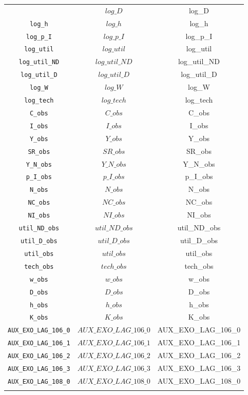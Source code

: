 \begin{center}
\begin{longtable}{ccc}
{\texttt{log\_D} & $log\_D$ & log\_D\\
\texttt{log\_h} & $log\_h$ & log\_h\\
\texttt{log\_p\_I} & $log\_p\_I$ & log\_p\_I\\
\texttt{log\_util} & $log\_util$ & log\_util\\
\texttt{log\_util\_ND} & $log\_util\_ND$ & log\_util\_ND\\
\texttt{log\_util\_D} & $log\_util\_D$ & log\_util\_D\\
\texttt{log\_W} & $log\_W$ & log\_W\\
\texttt{log\_tech} & $log\_tech$ & log\_tech\\
\texttt{C\_obs} & $C\_obs$ & C\_obs\\
\texttt{I\_obs} & $I\_obs$ & I\_obs\\
\texttt{Y\_obs} & $Y\_obs$ & Y\_obs\\
\texttt{SR\_obs} & $SR\_obs$ & SR\_obs\\
\texttt{Y\_N\_obs} & $Y\_N\_obs$ & Y\_N\_obs\\
\texttt{p\_I\_obs} & $p\_I\_obs$ & p\_I\_obs\\
\texttt{N\_obs} & $N\_obs$ & N\_obs\\
\texttt{NC\_obs} & $NC\_obs$ & NC\_obs\\
\texttt{NI\_obs} & $NI\_obs$ & NI\_obs\\
\texttt{util\_ND\_obs} & $util\_ND\_obs$ & util\_ND\_obs\\
\texttt{util\_D\_obs} & $util\_D\_obs$ & util\_D\_obs\\
\texttt{util\_obs} & $util\_obs$ & util\_obs\\
\texttt{tech\_obs} & $tech\_obs$ & tech\_obs\\
\texttt{w\_obs} & $w\_obs$ & w\_obs\\
\texttt{D\_obs} & $D\_obs$ & D\_obs\\
\texttt{h\_obs} & $h\_obs$ & h\_obs\\
\texttt{K\_obs} & $K\_obs$ & K\_obs\\
\texttt{AUX\_EXO\_LAG\_106\_0} & $AUX\_EXO\_LAG\_106\_0$ & AUX\_EXO\_LAG\_106\_0\\
\texttt{AUX\_EXO\_LAG\_106\_1} & $AUX\_EXO\_LAG\_106\_1$ & AUX\_EXO\_LAG\_106\_1\\
\texttt{AUX\_EXO\_LAG\_106\_2} & $AUX\_EXO\_LAG\_106\_2$ & AUX\_EXO\_LAG\_106\_2\\
\texttt{AUX\_EXO\_LAG\_106\_3} & $AUX\_EXO\_LAG\_106\_3$ & AUX\_EXO\_LAG\_106\_3\\
\texttt{AUX\_EXO\_LAG\_108\_0} & $AUX\_EXO\_LAG\_108\_0$ & AUX\_EXO\_LAG\_108\_0\\
}
\end{longtable}
\end{center}
